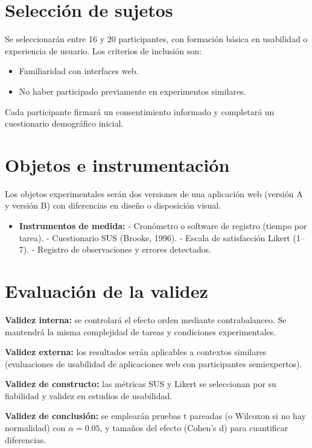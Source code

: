 \documentclass[a4paper,12pt]{report}
\begin{document}
\section{Selección de sujetos}
Se seleccionarán entre 16 y 20 participantes, con formación básica en usabilidad o experiencia de usuario. Los criterios de inclusión son:
\begin{itemize}
    \item Familiaridad con interfaces web.
    \item No haber participado previamente en experimentos similares.
\end{itemize}
Cada participante firmará un consentimiento informado y completará un cuestionario demográfico inicial.

\section{Objetos e instrumentación}
Los objetos experimentales serán dos versiones de una aplicación web (versión A y versión B) con diferencias en diseño o disposición visual.  
\begin{itemize}
    \item \textbf{Instrumentos de medida:}  
    - Cronómetro o software de registro (tiempo por tarea).  
    - Cuestionario SUS (Brooke, 1996).  
    - Escala de satisfacción Likert (1--7).  
    - Registro de observaciones y errores detectados.  
\end{itemize}

\section{Evaluación de la validez}

\textbf{Validez interna:} se controlará el efecto orden mediante contrabalanceo. Se mantendrá la misma complejidad de tareas y condiciones experimentales.  

\textbf{Validez externa:} los resultados serán aplicables a contextos similares (evaluaciones de usabilidad de aplicaciones web con participantes semiexpertos).  

\textbf{Validez de constructo:} las métricas SUS y Likert se seleccionan por su fiabilidad y validez en estudios de usabilidad.  

\textbf{Validez de conclusión:} se emplearán pruebas t pareadas (o Wilcoxon si no hay normalidad) con $\alpha=0.05$, y tamaños del efecto (Cohen’s d) para cuantificar diferencias.

\end{document}
